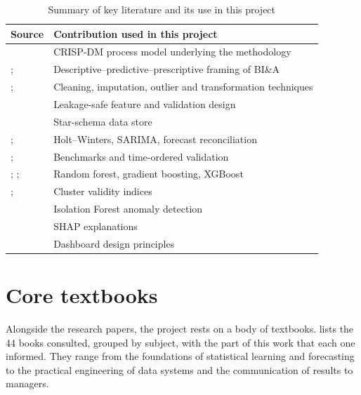 \begin{table}[htbp]\centering\small
\caption{Summary of key literature and its use in this project}\label{tab:litsummary}
\begin{tabularx}{\linewidth}{@{}p{3.6cm}X@{}}
\toprule
\textbf{Source} & \textbf{Contribution used in this project} \\ \midrule
\citet{shearer2000} & CRISP-DM process model underlying the methodology \\
\citet{chen2012}; \citet{sharda2018} & Descriptive--predictive--prescriptive framing of BI\&A \\
\citet{garcia2015}; \citet{han2012} & Cleaning, imputation, outlier and transformation techniques \\
\citet{kaufman2012} & Leakage-safe feature and validation design \\
\citet{kimball2013} & Star-schema data store \\
\citet{hyndman2021}; \citet{winters1960} & Holt--Winters, SARIMA, forecast reconciliation \\
\citet{makridakis2018}; \citet{bergmeir2012} & Benchmarks and time-ordered validation \\
\citet{breiman2001}; \citet{friedman2001}; \citet{chen2016} & Random forest, gradient boosting, XGBoost \\
\citet{rousseeuw1987}; \citet{davies1979} & Cluster validity indices \\
\citet{liu2008} & Isolation Forest anomaly detection \\
\citet{lundberg2017} & SHAP explanations \\
\citet{few2013} & Dashboard design principles \\ \bottomrule
\end{tabularx}
\end{table}

\section{Core textbooks}\label{sec:books}
Alongside the research papers, the project rests on a body of textbooks.  lists the 44 books
consulted, grouped by subject, with the part of this work that each one informed. They range from the
foundations of statistical learning and forecasting to the practical engineering of data systems and the
communication of results to managers.


